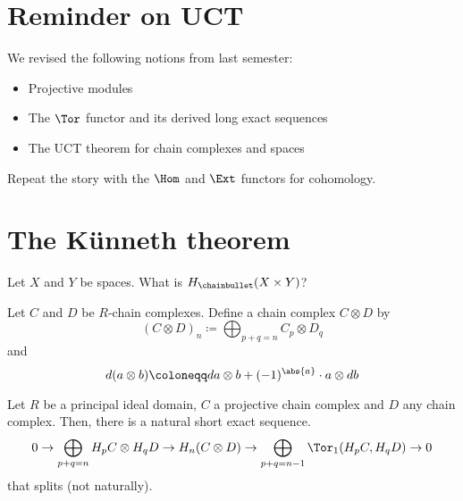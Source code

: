 
\section{Reminder on UCT}

\begin{editor}
  We revised the following notions from last semester:
  \begin{itemize}
    \item Projective modules
    \item The $\Tor$ functor and its derived long exact sequences
    \item The UCT theorem for chain complexes and spaces
  \end{itemize}
\end{editor}

\begin{exercise}
  Repeat the story with the  $\Hom$ and  $\Ext$ functors for cohomology.
\end{exercise}



\section{The Künneth theorem}

\begin{question}
  Let $X$ and  $Y$ be spaces.
  What is  $H_\chainbullet (X \times Y)$?
\end{question}

\begin{definition}
  Let $C$ and  $D$ be  $R$-chain complexes.
  Define a chain complex $C \otimes D$ by
  \[
    (C \otimes D)_n \coloneqq \bigoplus_{p + q = n} C_p \otimes D_q
  \]
  and
  \[
  d ( a \otimes b) \coloneqq  da \otimes b + (-1)^{\abs{a} } \cdot a \otimes db
  \] 
\end{definition}

\begin{theorem}
  Let $R$ be a principal ideal domain,
   $C$ a projective chain complex and  $D$ any chain complex.
   Then, there is a natural short exact sequence.
    \[
     0
     \to
     \bigoplus_{p + q = n} H_pC \otimes H_q D 
     \to
     H_n (C \otimes D)
     \to 
     \bigoplus_{p + q = n-1} \Tor_1(H_pC, H_qD)
     \to
     0
   \]
   that splits (not naturally).
\end{theorem}
